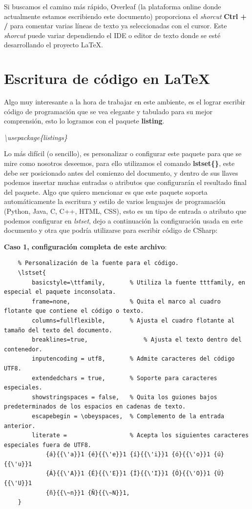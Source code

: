 Si buscamos el camino más rápido, Overleaf (la plataforma online donde actualmente estamos escribiendo este documento) proporciona el \textit{shorcut} \textbf{Ctrl + /} para comentar varias líneas de texto ya seleccionadas con el cursor. Este \textit{shorcut} puede variar dependiendo el IDE o editor de texto donde se esté desarrollando el proyecto \LaTeX.



\section{Escritura de código en \LaTeX}
\hspace{0.55cm}Algo muy interesante a la hora de trabajar en este ambiente, es el lograr escribir código de programación que se vea elegante y tabulado para su mejor comprensión, esto lo logramos con el paquete \textbf{listing}.
\begin{center}
    \textit{\textbackslash{usepackage\{listings\}}}
\end{center}
    
Lo más difícil (o sencillo), es personalizar o configurar este paquete para que se mire como nosotros deseemos, para ello utilizamos el comando \textbf{lstset\{\}}, este debe ser posicionado antes del comienzo del documento, y dentro de sus llaves podemos insertar muchas entradas o atributos que configurarán el resultado final del paquete. Algo que quiero mencionar es que este paquete soporta automáticamente la escritura y estilo de varios lenguajes de programación (Python, Java, C, C++, HTML, CSS), esto es un tipo de entrada o atributo que podemos configurar en \textit{lstset}, dejo a continuación la configuración usada en este documento y otra que podría utilizarse para escribir código de CSharp:

\textbf{Caso 1, configuración completa de este archivo}:
\begin{lstlisting}
    % Personalización de la fuente para el código.
    \lstset{
        basicstyle=\ttfamily,		% Utiliza la fuente tttfamily, en especial el paquete inconsolata.
        frame=none,					% Quita el marco al cuadro flotante que contiene el código o texto.
        columns=fullflexible,		% Ajusta el cuadro flotante al tamaño del texto del documento.
        breaklines=true,				% Ajusta el texto dentro del contenedor.
        inputencoding = utf8,		% Admite caracteres del código UTF8.
        extendedchars = true,		% Soporte para caracteres especiales.
        showstringspaces = false,	% Quita los guiones bajos predeterminados de los espacios en cadenas de texto.
        escapebegin = \obeyspaces,	% Complemento de la entrada anterior.
        literate =					% Acepta los siguientes caracteres especiales fuera de UTF8.
            {á}{{\'a}}1 {é}{{\'e}}1 {í}{{\'i}}1 {ó}{{\'o}}1 {ú}{{\'u}}1
            {Á}{{\'A}}1 {É}{{\'E}}1 {Í}{{\'I}}1 {Ó}{{\'O}}1 {Ú}{{\'U}}1
            {ñ}{{\~n}}1 {Ñ}{{\~N}}1,
    }
\end{lstlisting}

